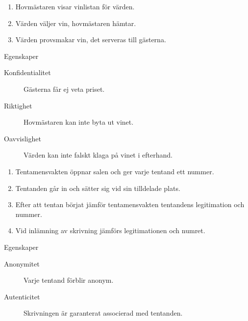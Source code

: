 \begin{frame}
  \begin{example}
    \begin{enumerate}
      \item Hovmästaren visar vinlistan för värden.
      \item Värden väljer vin, hovmästaren hämtar.
      \item Värden provsmakar vin, det serveras till gästerna.
    \end{enumerate}
  \end{example}

  \pause{}

  \begin{block}{Egenskaper}
    \begin{description}
      \item[Konfidentialitet] Gästerna får ej veta priset.
      \item[Riktighet] Hovmästaren kan inte byta ut vinet.
      \item[Oavvislighet] Värden kan inte falskt klaga på vinet i efterhand.
    \end{description}
  \end{block}
\end{frame}

\begin{frame}
  \begin{example}
    \begin{enumerate}
      \item Tentamensvakten öppnar salen och ger varje tentand ett nummer.
      \item Tentanden går in och sätter sig vid sin tilldelade plats.
      \item Efter att tentan börjat jämför tentamensvakten tentandens 
        legitimation och nummer.
      \item Vid inlämning av skrivning jämförs legitimationen och numret.
    \end{enumerate}
  \end{example}

  \pause{}

  \begin{block}{Egenskaper}
    \begin{description}
      \item[Anonymitet] Varje tentand förblir anonym.
      \item[Autenticitet] Skrivningen är garanterat associerad med tentanden.
    \end{description}
  \end{block}
\end{frame}

